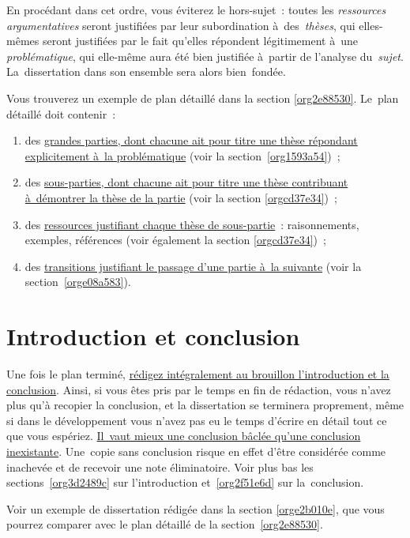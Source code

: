 \documentclass[a4paper,12pt]{report}
\begin{document}
En procédant dans cet ordre, vous éviterez le hors-sujet : toutes les
\emph{ressources argumentatives} seront justifiées par leur subordination
à des \emph{thèses}, qui elles-mêmes seront justifiées par le fait qu'elles
répondent légitimement à une \emph{problématique}, qui elle-même aura été
bien justifiée à partir de l'analyse du \emph{sujet}. La dissertation dans
son ensemble sera alors bien fondée.

Vous trouverez un exemple de plan détaillé dans la section \ref{org2e88530}.
Le plan détaillé doit contenir :

\begin{enumerate}
\item des \uline{grandes parties, dont chacune ait pour titre une thèse répondant
explicitement à la problématique} (voir la section \ref{org1593a54}) ;

\item des \uline{sous-parties, dont chacune ait pour titre une thèse contribuant
à démontrer la thèse de la partie} (voir la section \ref{orgcd37e34}) ;

\item des \uline{ressources justifiant chaque thèse de sous-partie} :
raisonnements, exemples, références (voir également la section
\ref{orgcd37e34}) ;

\item des \uline{transitions justifiant le passage d'une partie à la suivante}
(voir la section \ref{orge08a583}).
\end{enumerate}


\chapter{Introduction et conclusion}
\label{sec:orga6da65d}

Une fois le plan terminé, \uline{rédigez intégralement au brouillon
l'introduction et la conclusion}​. Ainsi, si vous êtes pris par le temps
en fin de rédaction, vous n'avez plus qu'à recopier la conclusion, et la
dissertation se terminera proprement, même si dans le développement vous
n'avez pas eu le temps d'écrire en détail tout ce que vous espériez.
\uline{Il vaut mieux une conclusion bâclée qu'une conclusion inexistante}.
Une copie sans conclusion risque en effet d'être considérée comme
inachevée et de recevoir une note éliminatoire. Voir plus bas les
sections \ref{org3d2489c} sur l'introduction et \ref{org2f51e6d} sur
la conclusion.

Voir un exemple de dissertation rédigée dans la section \ref{orge2b010e}, que
vous pourrez comparer avec le plan détaillé de la section \ref{org2e88530}.
\end{document}
